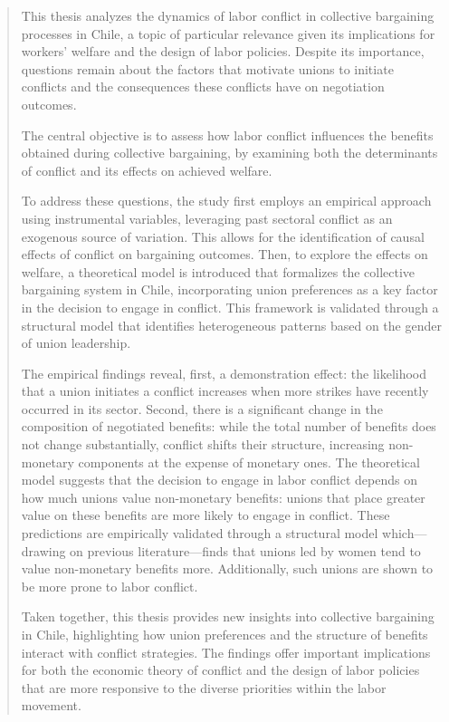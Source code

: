\documentclass[english]{umemoria}
\begin{document}
\begin{abstract}
This thesis analyzes the dynamics of labor conflict in collective bargaining processes in Chile, a topic of particular relevance given its implications for workers' welfare and the design of labor policies. Despite its importance, questions remain about the factors that motivate unions to initiate conflicts and the consequences these conflicts have on negotiation outcomes.

The central objective is to assess how labor conflict influences the benefits obtained during collective bargaining, by examining both the determinants of conflict and its effects on achieved welfare.

To address these questions, the study first employs an empirical approach using instrumental variables, leveraging past sectoral conflict as an exogenous source of variation. This allows for the identification of causal effects of conflict on bargaining outcomes. Then, to explore the effects on welfare, a theoretical model is introduced that formalizes the collective bargaining system in Chile, incorporating union preferences as a key factor in the decision to engage in conflict. This framework is validated through a structural model that identifies heterogeneous patterns based on the gender of union leadership.

The empirical findings reveal, first, a demonstration effect: the likelihood that a union initiates a conflict increases when more strikes have recently occurred in its sector. Second, there is a significant change in the composition of negotiated benefits: while the total number of benefits does not change substantially, conflict shifts their structure, increasing non-monetary components at the expense of monetary ones. The theoretical model suggests that the decision to engage in labor conflict depends on how much unions value non-monetary benefits: unions that place greater value on these benefits are more likely to engage in conflict. These predictions are empirically validated through a structural model which—drawing on previous literature—finds that unions led by women tend to value non-monetary benefits more. Additionally, such unions are shown to be more prone to labor conflict.

Taken together, this thesis provides new insights into collective bargaining in Chile, highlighting how union preferences and the structure of benefits interact with conflict strategies. The findings offer important implications for both the economic theory of conflict and the design of labor policies that are more responsive to the diverse priorities within the labor movement.


\end{abstract}
\end{document}

